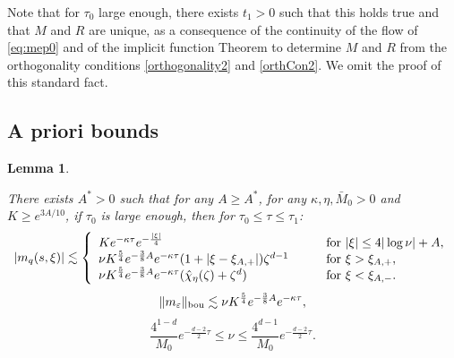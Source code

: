 \documentclass[11pt]{aims}
\newtheorem{lemma}[theorem]{Lemma}
\theoremstyle{definition}
\newcommand{\bd}{\textup{bou}}
\newcommand{\be}{\begin{equation}}
\newcommand{\ee}{\end{equation}}
\numberwithin{equation}{section}
\begin{document}
Note that for $\tau_0$ large enough, there exists $t_1>0$ such that this holds true and that $M$ and $R$ are unique, as a consequence of the continuity of the flow of \eqref{eq:mep0} and of the implicit function Theorem to determine $M$ and $R$ from the orthogonality conditions \eqref{orthogonality2} and \eqref{orthCon2}. We omit the proof of this standard fact. 



\subsection{A priori bounds}

\begin{lemma} \label{lem:aprioriestimates}

There exists $A^*>0$ such that for any $A\geq A^*$, for any $\kappa,\eta,\bar M_0>0$ and $K\geq e^{3A/10}$, if $\tau_0$ is large enough, then for $\tau_0\leq \tau \leq \tau_1$:
\be \label{bd:pointwisemq}
|m_q (s,\xi)|\lesssim \left\{
\begin{array}{l l l l}
Ke^{-\kappa \tau}e^{-\frac{|\xi|}{4}} &\qquad  \mbox{for }|\xi|\leq 4|\log \nu|+A,\\
\nu K^{\frac 54}e^{-\frac 38 A} e^{-\kappa \tau}(1+|\xi-\xi_{A,+}|)\zeta^{d-1}&\qquad  \mbox{for } \xi>  \xi_{A,+},\\
\nu K^{\frac 54}e^{-\frac 38 A} e^{-\kappa \tau}(\hat \chi_\eta(\zeta)+\zeta^d) & \qquad \mbox{for } \xi <\xi_{A,-}.
\end{array}
 \right.
\ee
\be \label{bd:boundarynorm}
\| m_\varepsilon \|_{\bd}\lesssim \nu K^{\frac{5}{4}} e^{-\frac 38 A} e^{-\kappa \tau},
\ee
\be \label{bd:estimationtau}
\frac{4^{1-d}}{M_0} e^{-\frac{d-2}{2}\tau}\leq \nu \leq \frac{4^{d-1}}{M_0} e^{-\frac{d-2}{2}\tau}.
\ee
\end{lemma}
\end{document}
